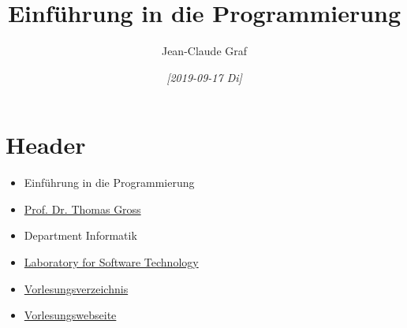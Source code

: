 \documentclass[11pt]{article}
\author{Jean-Claude Graf}
\date{\textit{[2019-09-17 Di]}}
\title{Einführung in die Programmierung}
\begin{document}
\maketitle
\tableofcontents

\setcounter{secnumdepth}{0}

\section{Header}
\label{sec:org1483c50}
\begin{itemize}
\item Einführung in die Programmierung\\
\item \href{https://www.bi.id.ethz.ch/personensuche/personenDetail.view?page=1\&lang=de\&schnellSuche=Thomas+Gross\&order=NAME\&descending=false\&paging=true\&pid=134a9}{Prof. Dr. Thomas Gross}\\
\item Department Informatik\\
\item \href{https://www.lst.inf.ethz.ch}{Laboratory for Software Technology}\\
\item \href{http://www.vvz.ethz.ch/Vorlesungsverzeichnis/lerneinheitPre.do?lerneinheitId=132733\&semkez=2019W\&lang=de}{Vorlesungsverzeichnis}\\
\item \href{https://www.lst.inf.ethz.ch/education/einfuehrung-in-die-programmierung-i--252-0027-.html}{Vorlesungswebseite}\\
\end{itemize}
\end{document}
